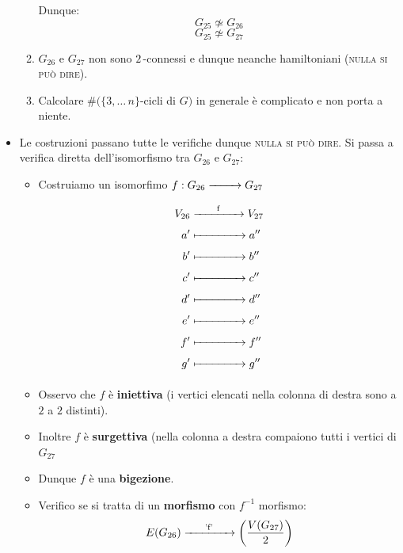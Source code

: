 \documentclass[10pt]{article}
\begin{document}
\begin{itemize}
\begin{enumerate}
	Dunque:
	$$G_{25} \not \simeq G_{26}$$
	$$G_{25} \not \simeq G_{27}$$
	\item
	$G_{26}$ e $G_{27}$ non sono $2\,$-connessi e dunque neanche hamiltoniani (\textsc{nulla si può dire}).
	\item
	Calcolare $\# (\{3,\dotso\,n\}$-cicli di $G)$ in generale è complicato e non porta a niente.
	\end{enumerate}
	\item
	Le costruzioni passano tutte le verifiche dunque \textsc{nulla si può dire}. Si passa a verifica diretta dell'isomorfismo tra $G_{26}$ e $G_{27}$:
	\begin{itemize}
	\item
	Costruiamo un isomorfimo $f: G_{26} \xrightarrow[\text{\quad\quad\quad}]{\text{}} G_{27}$
	\begin{equation}
	\begin{split}
	V_{26} & \xrightarrow[\text{\quad\quad\quad\quad\quad}]{\text{f}} V_{27} \\
		a' & \xmapsto[\text{\quad\,\quad\quad\quad\quad}]{\text{}} a'' \\
		b' & \xmapsto[\text{\quad\,\quad\quad\quad\quad}]{\text{}} b'' \\
		c' & \xmapsto[\text{\quad\,\quad\quad\quad\quad}]{\text{}} c'' \\
		d' & \xmapsto[\text{\quad\,\quad\quad\quad\quad}]{\text{}} d'' \\
		e' & \xmapsto[\text{\quad\,\quad\quad\quad\quad}]{\text{}} e'' \\
		f' & \xmapsto[\text{\quad\,\quad\quad\quad\quad}]{\text{}} f'' \\
		g' & \xmapsto[\text{\quad\,\quad\quad\quad\quad}]{\text{}} g''
		\notag
	\end{split}
	\end{equation}
	\item
	Osservo che $f$ è \textbf{iniettiva} (i vertici elencati nella colonna di destra sono a $2$ a $2$ distinti).
	\item
	Inoltre $f$ è \textbf{surgettiva} (nella colonna a destra compaiono tutti i vertici di $G_{27}$
	\item
	Dunque $f$ è una \textbf{bigezione}.
	\item
	Verifico se si tratta di un \textbf{morfismo} con $f^{-1}$ morfismo:
	\begin{equation}
	\begin{split}
	E(G_{26}) & \xrightarrow[\text{\quad\quad\quad\quad\quad}]{\text{'f'}} \displaystyle{\left(\frac{V(G_{27})}{2}\right)} \smallskip\smallskip \\	

\end{split}
\end{equation}
\end{itemize}
\end{itemize}
\end{document}
